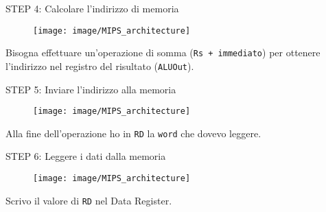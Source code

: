 \documentclass[../main.tex]{subfiles}
\begin{document}
    \begin{adjustwidth}{1cm}{1cm}
        STEP 4: Calcolare l'indirizzo di memoria \\

        \begin{figure}[h!]
            \centering

            \vspace*{5mm}
            \hspace*{1cm} \texttt{[image: image/MIPS\_architecture]}
            \vspace*{5mm}
        \end{figure}

        \noindent
        Bisogna effettuare un'operazione di somma (\texttt{Rs + immediato})
        per ottenere l'indirizzo nel registro del risultato (\texttt{ALUOut}).
    \end{adjustwidth}

    \vspace*{3mm}

    \begin{adjustwidth}{1cm}{1cm}
        STEP 5: Inviare l'indirizzo alla memoria \\

        \begin{figure}[h!]
            \centering

            \vspace*{5mm}
            \hspace*{1cm} \texttt{[image: image/MIPS\_architecture]}
            \vspace*{5mm}
        \end{figure}

        \noindent
        Alla fine dell'operazione ho in \texttt{RD}
        la \texttt{word} che dovevo leggere.
    \end{adjustwidth}

    \newpage

    \begin{adjustwidth}{1cm}{1cm}
        STEP 6: Leggere i dati dalla memoria \\

        \begin{figure}[h!]
            \centering

            \vspace*{5mm}
            \hspace*{1cm} \texttt{[image: image/MIPS\_architecture]}
            \vspace*{5mm}
        \end{figure}

        \noindent
        Scrivo il valore di \texttt{RD} nel Data Register.
    \end{adjustwidth}
\end{document}
